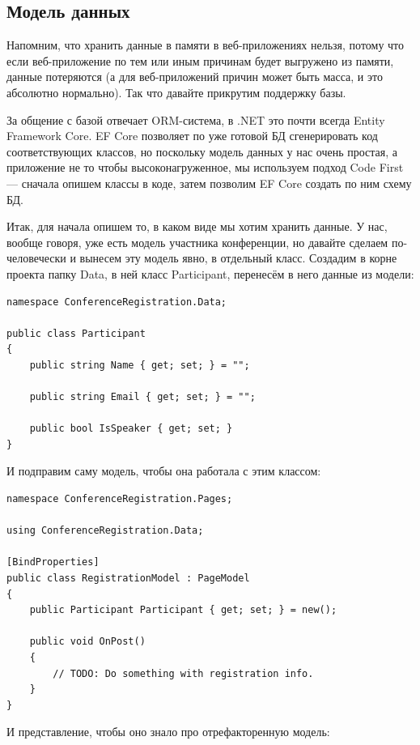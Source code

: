 \documentclass{../../text-style}
\begin{document}
\subsection{Модель данных}

Напомним, что хранить данные в памяти в веб-приложениях нельзя, потому что если веб-приложение по тем или иным причинам будет выгружено из памяти, данные потеряются (а для веб-приложений причин может быть масса, и это абсолютно нормально). Так что давайте прикрутим поддержку базы. 

За общение с базой отвечает ORM-система, в .NET это почти всегда Entity Framework Core. EF Core позволяет по уже готовой БД сгенерировать код соответствующих классов, но поскольку модель данных у нас очень простая, а приложение не то чтобы высоконагруженное, мы используем подход Code First --- сначала опишем классы в коде, затем позволим EF Core создать по ним схему БД.

Итак, для начала опишем то, в каком виде мы хотим хранить данные. У нас, вообще говоря, уже есть модель участника конференции, но давайте сделаем по-человечески и вынесем эту модель явно, в отдельный класс. Создадим в корне проекта папку Data, в ней класс Participant, перенесём в него данные из модели:

\begin{verbatim}
namespace ConferenceRegistration.Data;

public class Participant
{
    public string Name { get; set; } = "";

    public string Email { get; set; } = "";

    public bool IsSpeaker { get; set; }
}
\end{verbatim}

И подправим саму модель, чтобы она работала с этим классом:

\begin{verbatim}
namespace ConferenceRegistration.Pages;

using ConferenceRegistration.Data;

[BindProperties]
public class RegistrationModel : PageModel
{
    public Participant Participant { get; set; } = new();

    public void OnPost()
    {
        // TODO: Do something with registration info.
    }
}
\end{verbatim}

И представление, чтобы оно знало про отрефакторенную модель:
\end{document}
